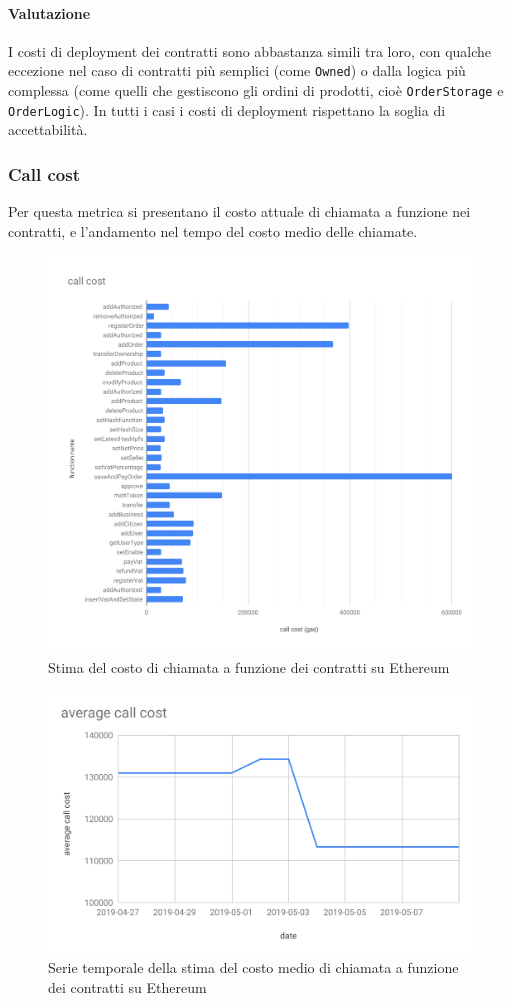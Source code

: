 \paragraph*{Valutazione}
I costi di deployment dei contratti sono abbastanza simili tra loro, con qualche eccezione nel caso di contratti più semplici (come \texttt{Owned}) o dalla logica più complessa (come quelli che gestiscono gli ordini di prodotti, cioè \texttt{OrderStorage} e \texttt{OrderLogic}). In tutti i casi i costi di deployment rispettano la soglia di accettabilità. 

\subsubsection{Call cost}
Per questa metrica si presentano il costo attuale di chiamata a funzione nei contratti, e l'andamento nel tempo del costo medio delle chiamate.
\begin{figure}[H]
	\centering
	\includegraphics[scale=0.4]{res/images/RA/call-cost.pdf}
	\caption{Stima del costo di chiamata a funzione dei contratti su Ethereum}
\end{figure}
\begin{figure}[H]
	\centering
	\includegraphics[scale=0.6]{res/images/RA/average-call-cost.pdf}
	\caption{Serie temporale della stima del costo medio di chiamata a funzione dei contratti su Ethereum}
\end{figure}
